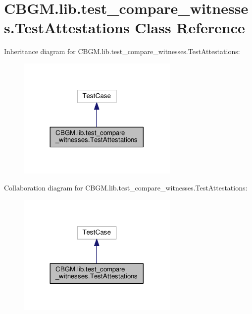 \hypertarget{classCBGM_1_1lib_1_1test__compare__witnesses_1_1TestAttestations}{}\section{C\+B\+G\+M.\+lib.\+test\+\_\+compare\+\_\+witnesses.\+Test\+Attestations Class Reference}
\label{classCBGM_1_1lib_1_1test__compare__witnesses_1_1TestAttestations}


Inheritance diagram for C\+B\+G\+M.\+lib.\+test\+\_\+compare\+\_\+witnesses.\+Test\+Attestations\+:\nopagebreak
\begin{figure}[H]
\begin{center}
\leavevmode
\includegraphics[width=221pt]{classCBGM_1_1lib_1_1test__compare__witnesses_1_1TestAttestations__inherit__graph}
\end{center}
\end{figure}


Collaboration diagram for C\+B\+G\+M.\+lib.\+test\+\_\+compare\+\_\+witnesses.\+Test\+Attestations\+:\nopagebreak
\begin{figure}[H]
\begin{center}
\leavevmode
\includegraphics[width=221pt]{classCBGM_1_1lib_1_1test__compare__witnesses_1_1TestAttestations__coll__graph}
\end{center}
\end{figure}
